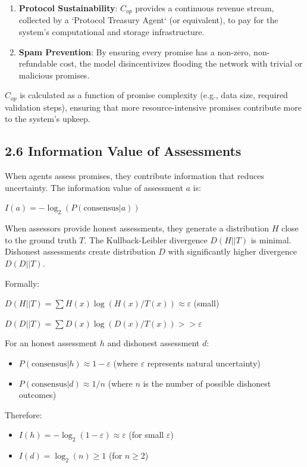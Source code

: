 \documentclass[11pt]{article}
\begin{document}
\begin{enumerate}
\item \textbf{Protocol Sustainability}: \(C_{op}\) provides a continuous revenue stream, collected by a `Protocol Treasury Agent` (or equivalent), to pay for the system's computational and storage infrastructure.
\item \textbf{Spam Prevention}: By ensuring every promise has a non-zero, non-refundable cost, the model disincentivizes flooding the network with trivial or malicious promises.
\end{enumerate}

\(C_{op}\) is calculated as a function of promise complexity (e.g., data size, required validation steps), ensuring that more resource-intensive promises contribute more to the system's upkeep.
\subsection{2.6 Information Value of Assessments}
\label{sec:orgdb481fd}
When agents assess promises, they contribute information that reduces uncertainty. The information value of assessment \(a\) is:

\(I(a) = -\log_2(P(\text{consensus}|a))\)

When assessors provide honest assessments, they generate a distribution \(H\) close to the ground truth \(T\). The Kullback-Leibler divergence \(D(H||T)\) is minimal. Dishonest assessments create distribution \(D\) with significantly higher divergence \(D(D||T)\).

Formally:

\(D(H||T) = \sum H(x) \log(H(x)/T(x)) \approx \varepsilon\) (small)

\(D(D||T) = \sum D(x) \log(D(x)/T(x)) >> \varepsilon\)

For an honest assessment \(h\) and dishonest assessment \(d\):
\begin{itemize}
\item \(P(\text{consensus}|h) \approx 1 - \varepsilon\) (where \(\varepsilon\) represents natural uncertainty)
\item \(P(\text{consensus}|d) \approx 1/n\) (where \(n\) is the number of possible dishonest outcomes)
\end{itemize}

Therefore:
\begin{itemize}
\item \(I(h) = -\log_2(1 - \varepsilon) \approx \varepsilon\) (for small \(\varepsilon\))
\item \(I(d) = \log_2(n) \geq 1\) (for \(n \geq 2\))
\end{itemize}
\end{document}
